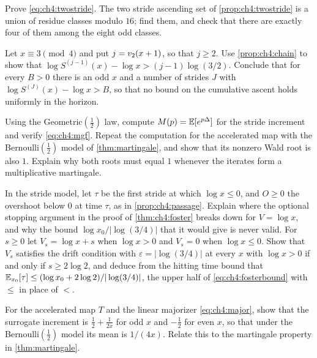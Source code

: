 \begin{exercise}
Prove \eqref{eq:ch4:twostride}. The two stride ascending set of
\cref{prop:ch4:twostride} is a union of residue classes modulo $16$; find
them, and check that there are exactly four of them among
the eight odd classes.
\end{exercise}

\begin{exercise}
Let $x\equiv3\pmod4$ and put $j=v_2(x+1)$, so that $j\ge2$.  Use \cref{prop:ch4:chain} to show that
$\log S^{(j-1)}(x)-\log x>(j-1)\log(3/2)$.  Conclude that for every $B>0$
there is an odd $x$ and a number of strides $J$ with
$\log S^{(J)}(x)-\log x>B$, so that no bound on the cumulative ascent holds
uniformly in the horizon.
\end{exercise}

\begin{exercise}
Using the Geometric$(\tfrac12)$ law, compute $M(p)=\mathbb{E}[e^{p\Delta}]$ for the
stride increment and verify \eqref{eq:ch4:mgf}.  Repeat the computation for
the accelerated map with the Bernoulli$(\tfrac12)$ model of
\cref{thm:martingale}, and show that its nonzero Wald root is also $1$.
Explain why both roots must equal $1$ whenever the iterates form a
multiplicative martingale.
\end{exercise}

\begin{exercise}\label{ex:ch4:passage}
In the stride model, let $\tau$ be the first stride at which $\log x\le0$, and $O\ge0$ the overshoot below $0$ at time $\tau$, as in \cref{prop:ch4:passage}. Explain where the optional stopping argument in the proof of \cref{thm:ch4:foster} breaks down for $V=\log x$, and why the bound $\log x_0/|\log(3/4)|$ that it would give is never valid. For $s\ge0$ let $V_s=\log x+s$ when $\log x>0$ and $V_s=0$ when $\log x\le0$. Show that $V_s$ satisfies the drift condition with $\varepsilon=|\log(3/4)|$ at every $x$ with $\log x>0$ if and only if $s\ge2\log2$, and deduce from the hitting time bound that $\mathbb{E}_{x_0}[\tau]\le(\log x_0+2\log2)/|\log(3/4)|$, the upper half of \eqref{eq:ch4:fosterbound} with $\le$ in place of $<$.
\end{exercise}

\begin{exercise}
For the accelerated map $T$ and the linear majorizer \eqref{eq:ch4:major},
show that the surrogate increment is $\tfrac12+\tfrac1{2x}$ for odd $x$ and
$-\tfrac12$ for even $x$, so that under the Bernoulli$(\tfrac12)$ model its
mean is $1/(4x)$.  Relate this to the martingale property in
\cref{thm:martingale}.
\end{exercise}
